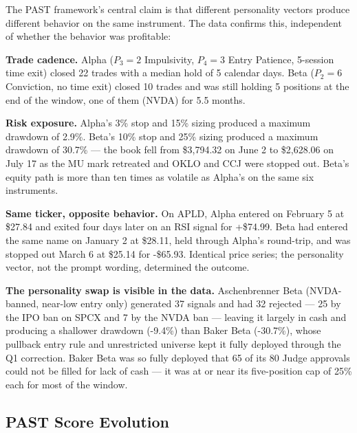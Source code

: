 \documentclass[11pt]{article}
\begin{document}
The PAST framework's central claim is that different personality vectors produce different behavior on the same instrument. The data confirms this, independent of whether the behavior was profitable:

\textbf{Trade cadence.} Alpha (\(P_3=2\) Impulsivity, \(P_4=3\) Entry Patience, 5-session time exit) closed 22 trades with a median hold of 5 calendar days. Beta (\(P_2=6\) Conviction, no time exit) closed 10 trades and was still holding 5 positions at the end of the window, one of them (NVDA) for 5.5 months.

\textbf{Risk exposure.} Alpha's 3\% stop and 15\% sizing produced a maximum drawdown of 2.9\%. Beta's 10\% stop and 25\% sizing produced a maximum drawdown of 30.7\% --- the book fell from \$3,794.32 on June 2 to \$2,628.06 on July 17 as the MU mark retreated and OKLO and CCJ were stopped out. Beta's equity path is more than ten times as volatile as Alpha's on the same six instruments.

\textbf{Same ticker, opposite behavior.} On APLD, Alpha entered on February 5 at \$27.84 and exited four days later on an RSI signal for +\$74.99. Beta had entered the same name on January 2 at \$28.11, held through Alpha's round-trip, and was stopped out March 6 at \$25.14 for -\$65.93. Identical price series; the personality vector, not the prompt wording, determined the outcome.

\textbf{The personality swap is visible in the data.} Aschenbrenner Beta (NVDA-banned, near-low entry only) generated 37 signals and had 32 rejected --- 25 by the IPO ban on SPCX and 7 by the NVDA ban --- leaving it largely in cash and producing a shallower drawdown (-9.4\%) than Baker Beta (-30.7\%), whose pullback entry rule and unrestricted universe kept it fully deployed through the Q1 correction. Baker Beta was so fully deployed that 65 of its 80 Judge approvals could not be filled for lack of cash --- it was at or near its five-position cap of 25\% each for most of the window.

\subsection{PAST Score Evolution}\label{past-score-evolution}
\end{document}
